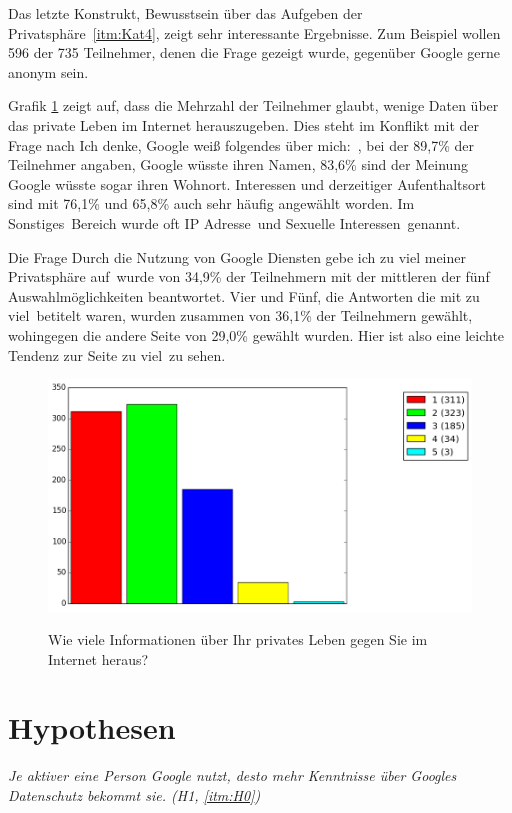Das letzte Konstrukt, \glqq Bewusstsein über das Aufgeben der Privatsphäre\grqq\ \ref{itm:Kat4}, zeigt sehr interessante Ergebnisse. Zum Beispiel wollen 596 der 735 Teilnehmer, denen die Frage gezeigt wurde, gegenüber Google gerne anonym sein.

Grafik \ref{giveinfo} zeigt auf, dass die Mehrzahl der Teilnehmer glaubt, wenige Daten über das private Leben im Internet herauszugeben. Dies steht im Konflikt mit der Frage nach \glqq Ich denke, Google weiß folgendes über mich:\grqq\ , bei der 89,7\% der Teilnehmer angaben, Google wüsste ihren Namen, 83,6\% sind der Meinung Google wüsste sogar ihren Wohnort. Interessen und derzeitiger Aufenthaltsort sind mit 76,1\% und 65,8\% auch sehr häufig angewählt worden. Im \glqq Sonstiges\grqq\ Bereich wurde oft \glqq IP Adresse\grqq\ und \glqq Sexuelle Interessen\grqq\ genannt.

Die Frage \glqq Durch die Nutzung von Google Diensten gebe ich zu viel meiner Privatsphäre auf\grqq\ wurde von 34,9\% der Teilnehmern mit der mittleren der fünf Auswahlmöglichkeiten beantwortet. Vier und Fünf, die Antworten die mit \glqq zu viel\grqq\ betitelt waren, wurden zusammen von 36,1\% der Teilnehmern gewählt, wohingegen die andere Seite von 29,0\% gewählt wurden. Hier ist also eine leichte Tendenz zur Seite \glqq zu viel\grqq\ zu sehen.

\begin{figure}[H]
\centering
\includegraphics[scale=0.55]{images/giveinfo}\\
\caption{Wie viele Informationen über Ihr privates Leben gegen Sie im Internet heraus?}\label{giveinfo}
\end{figure}

\section{Hypothesen}
\textit{Je aktiver eine Person Google nutzt, desto mehr Kenntnisse über Googles Datenschutz bekommt sie. (H1, \ref{itm:H0})}

